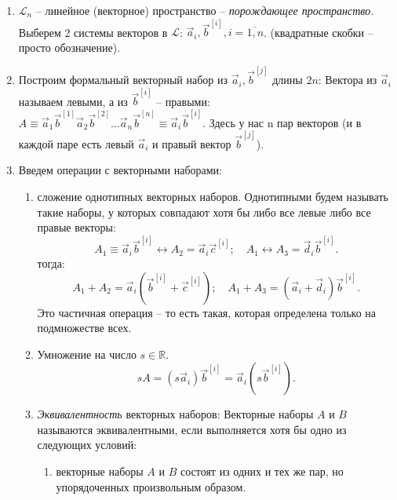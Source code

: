 \begin{definition}
  \begin{enumerate}
    
    \item $\mathcal{L}_n$ -- линейное (векторное) пространство -- \emph{порождающее пространство}.
      Выберем 2 системы векторов в $\mathcal{L}$: $\vec{a}_i, \vec{b}^{[i]}, i = \overline{1, n}$.
      (квадратные скобки -- просто обозначение).

    \item Построим формальный векторный набор из $\vec{a}_i, \vec{b}^{[j]}$ длины $2n$:
      Вектора из $\vec{a}_i$ называем левыми, а из $\vec{b}^{[i]}$ -- правыми: 
      $A \equiv \vec{a}_1 \vec{b}^{[1]} \vec{a}_2 \vec{b}^{[2]} \dots \vec{a}_n \vec{b}^{[n]}
      \equiv \vec{a}_i \vec{b}^{[i]}$.
      Здесь у нас n пар векторов (и в каждой паре есть левый $\vec{a}_i$ и правый вектор
      $\vec{b}^{[j]}$).

    \item Введем операции с векторными наборами:
      \begin{enumerate}
        \item сложение однотипных векторных наборов. Однотипными будем называть такие наборы, у 
          которых совпадают хотя бы либо все левые либо все правые векторы:
          \[
            A_1 \equiv \vec{a}_i \vec{b}^{[i]} \leftrightarrow A_2 = \vec{a}_i \vec{c}^{[i]}; 
            \quad
            A_1 \leftrightarrow A_3 = \vec{d}_i \vec{b}^{[i]}.
          \]
          тогда:
          \[
            A_1+A_2 = \vec{a}_i (\vec{b}^{[i]} + \vec{c}^{[i]}); \quad
            A_1+A_3 = (\vec{a}_i + \vec{d}_i) \vec{b}^{[i]}.
          \]
          Это частичная операция -- то есть такая, которая определена только на подмножестве всех.

        \item Умножение на число $s \in \mathbb{R}$.
          \[
            sA = (s \vec{a}_i) \vec{b}^{[i]} = \vec{a}_i (s \vec{b}^{[i]}).
          \]
        
        \item \emph{Эквивалентность} векторных наборов:
          Векторные наборы $A$ и $B$ называются эквивалентными, если выполняется хотя бы одно 
          из следующих условий:
          \begin{enumerate}
            \item векторные наборы $A$ и $B$ состоят из одних и тех же пар, но упорядоченных
              произвольным образом.
              

\end{enumerate}
\end{enumerate}
\end{enumerate}
\end{definition}
